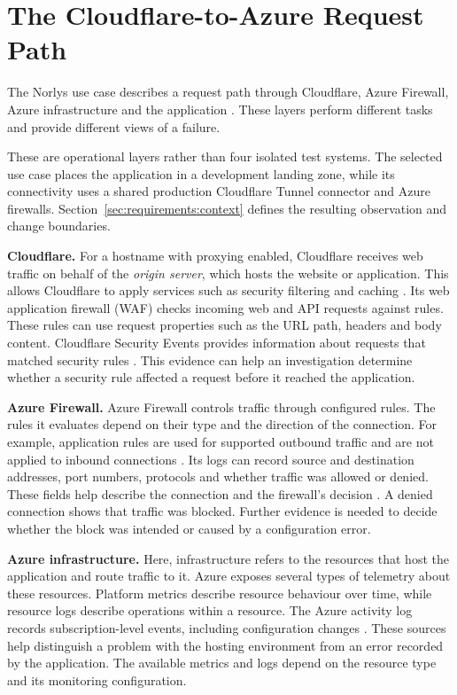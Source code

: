 \section{The Cloudflare-to-Azure Request Path}
\label{sec:background:request-path}

The Norlys use case describes a request path through Cloudflare, Azure
Firewall, Azure infrastructure and the application
\parencite[Background]{norlys_operations_agents}. These layers perform
different tasks and provide different views of a failure.

These are operational layers rather than four isolated test systems. The
selected use case places the application in a development landing zone,
while its connectivity uses a shared production Cloudflare Tunnel connector
and Azure firewalls. Section~\ref{sec:requirements:context} defines the
resulting observation and change boundaries.

\noindent\textbf{Cloudflare.} For a hostname with proxying enabled,
Cloudflare receives web traffic on behalf of the \emph{origin server},
which hosts the website or application. This allows Cloudflare to apply
services such as security filtering and caching
\parencite{cloudflare2026proxy}. Its web application firewall (WAF) checks
incoming web and API requests against rules. These rules can use request
properties such as the URL path, headers and body content. Cloudflare
Security Events provides information about requests that matched security
rules \parencite{cloudflare2026waf}. This evidence can help an investigation
determine whether a security rule affected a request before it reached
the application.

\noindent\textbf{Azure Firewall.} Azure Firewall controls traffic through
configured rules. The rules it evaluates depend on their type and the
direction of the connection. For example, application rules are used for
supported outbound traffic and are not applied to inbound connections
\parencite{microsoft2026firewallrules}. Its logs can record source and
destination addresses, port numbers, protocols and whether traffic was
allowed or denied. These fields help describe the connection and the
firewall's decision \parencite{microsoft2026firewallmonitor}. A denied
connection shows that traffic was blocked. Further evidence is needed to
decide whether the block was intended or caused by a configuration error.

\noindent\textbf{Azure infrastructure.} Here, infrastructure refers to the
resources that host the application and route traffic to it. Azure exposes
several types of telemetry about these resources. Platform metrics describe
resource behaviour over time, while resource logs describe operations
within a resource. The Azure activity log records subscription-level
events, including configuration changes
\parencite{microsoft2026monitordata}. These sources help distinguish a
problem with the hosting environment from an error recorded by the
application. The available metrics and logs depend on the resource type
and its monitoring configuration.

